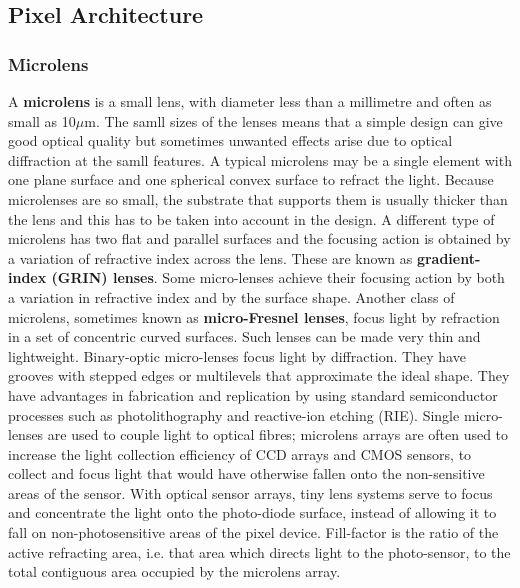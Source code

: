 \documentclass[10pt]{article}
\begin{document}
\begin{multicols}{2}
\subsection{Pixel Architecture}
\subsubsection{Microlens}
A \textbf{microlens} is a small lens, with diameter less than a millimetre and often as small as 10$\mu$m. The samll sizes of the lenses means that a simple design can give good optical quality but sometimes unwanted effects arise due to optical diffraction at the samll features. A typical microlens may be a single element with one plane surface and one spherical convex surface to refract the light.
Because microlenses are so small, the substrate that supports them is usually thicker than the lens and this has to be taken into account in the design.
\newline \newline
A different type of microlens has two flat and parallel surfaces and the focusing action is obtained by a variation of refractive index across the lens. These are known as \textbf{gradient-index (GRIN) lenses}. Some micro-lenses achieve their focusing action by both a variation in refractive index and by the surface shape.
\newline \newline
Another class of microlens, sometimes known as \textbf{micro-Fresnel lenses}, focus light by refraction in a set of concentric curved surfaces. Such lenses can be made very thin and lightweight. Binary-optic micro-lenses focus light by diffraction. They have grooves with stepped edges or multilevels that approximate the ideal shape. They have advantages in fabrication and replication by using standard semiconductor processes such as photolithography and reactive-ion etching (RIE).
\newline \newline
Single micro-lenses are used to couple light to optical fibres; microlens arrays are often used to increase the light collection efficiency of CCD arrays and CMOS sensors, to collect and focus light that would have otherwise fallen onto the non-sensitive areas of the sensor.
\newline \newline
With optical sensor arrays, tiny lens systems serve to focus and concentrate the light onto the photo-diode surface, instead of allowing it to fall on non-photosensitive areas of the pixel device. Fill-factor is the ratio of the active refracting area, i.e. that area which directs light to the photo-sensor, to the total contiguous area occupied by the microlens array.


\end{multicols}
\end{document}
